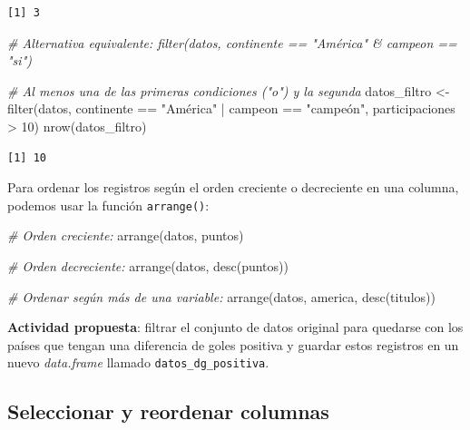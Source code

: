 \documentclass[
]{book}
\newenvironment{Shaded}{\begin{snugshade}}{\end{snugshade}}
\newcommand{\CommentTok}[1]{\textcolor[rgb]{0.56,0.35,0.01}{\textit{#1}}}
\newcommand{\DecValTok}[1]{\textcolor[rgb]{0.00,0.00,0.81}{#1}}
\newcommand{\FunctionTok}[1]{\textcolor[rgb]{0.00,0.00,0.00}{#1}}
\newcommand{\NormalTok}[1]{#1}
\newcommand{\OtherTok}[1]{\textcolor[rgb]{0.56,0.35,0.01}{#1}}
\newcommand{\SpecialCharTok}[1]{\textcolor[rgb]{0.00,0.00,0.00}{#1}}
\newcommand{\StringTok}[1]{\textcolor[rgb]{0.31,0.60,0.02}{#1}}
\begin{document}
\begin{verbatim}
[1] 3
\end{verbatim}

\begin{Shaded}
\begin{Highlighting}[]
\CommentTok{\# Alternativa equivalente: filter(datos, continente == "América" \& campeon == "si")}

\CommentTok{\# Al menos una de las primeras condiciones ("o") y la segunda}
\NormalTok{datos\_filtro }\OtherTok{\textless{}{-}} \FunctionTok{filter}\NormalTok{(datos, continente }\SpecialCharTok{==} \StringTok{"América"} \SpecialCharTok{|}\NormalTok{ campeon }\SpecialCharTok{==} \StringTok{"campeón"}\NormalTok{, participaciones }\SpecialCharTok{\textgreater{}} \DecValTok{10}\NormalTok{)}
\FunctionTok{nrow}\NormalTok{(datos\_filtro)}
\end{Highlighting}
\end{Shaded}

\begin{verbatim}
[1] 10
\end{verbatim}

Para ordenar los registros según el orden creciente o decreciente en una columna, podemos usar la función \texttt{arrange()}:

\begin{Shaded}
\begin{Highlighting}[]
\CommentTok{\# Orden creciente:}
\FunctionTok{arrange}\NormalTok{(datos, puntos)}

\CommentTok{\# Orden decreciente:}
\FunctionTok{arrange}\NormalTok{(datos, }\FunctionTok{desc}\NormalTok{(puntos))}

\CommentTok{\# Ordenar según más de una variable:}
\FunctionTok{arrange}\NormalTok{(datos, america, }\FunctionTok{desc}\NormalTok{(titulos))}
\end{Highlighting}
\end{Shaded}

\textbf{Actividad propuesta}: filtrar el conjunto de datos original para quedarse con los países que tengan una diferencia de goles positiva y guardar estos registros en un nuevo \emph{data.frame} llamado \texttt{datos\_dg\_positiva}.

\hypertarget{seleccionar-y-reordenar-columnas}{%
\subsection{Seleccionar y reordenar columnas}\label{seleccionar-y-reordenar-columnas}}
\end{document}
